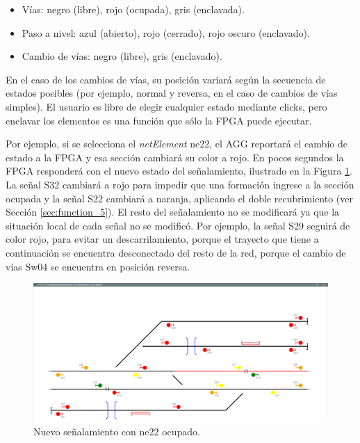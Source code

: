 	\begin{itemize}
		\item Vías: negro (libre), rojo (ocupada), gris (enclavada).
		\item Paso a nivel: azul (abierto), rojo (cerrado), rojo oscuro (enclavado).
		\item Cambio de vías: negro (libre), gris (enclavado).
	\end{itemize}
	
	En el caso de los cambios de vías, su posición variará según la secuencia de estados posibles (por ejemplo, normal y reversa, en el caso de cambios de vías simples). El usuario es libre de elegir cualquier estado mediante clicks, pero enclavar los elementos es una función que sólo la FPGA puede ejecutar.
	
	Por ejemplo, si se selecciona el \textit{netElement} ne22, el AGG reportará el cambio de estado a la FPGA y esa sección cambiará su color a rojo. En pocos segundos la FPGA responderá con el nuevo estado del señalamiento, ilustrado en la Figura \ref{fig:EJ1_AGG_S32_OCCUPIED}. La señal S32 cambiará a rojo para impedir que una formación ingrese a la sección ocupada y la señal S22 cambiará a naranja, aplicando el doble recubrimiento (ver Sección \ref{sec:function_5}). El resto del señalamiento no se modificará ya que la situación local de cada señal no se modificó. Por ejemplo, la señal S29 seguirá de color rojo, para evitar un descarrilamiento, porque el trayecto que tiene a continuación se encuentra desconectado del resto de la red, porque el cambio de vías Sw04 se encuentra en posición reversa.
	
	\begin{figure}[H]
		\centering
		\includegraphics[origin = c, width=1\textwidth]{resultados-obtenidos/ejemplo1/images/AGG_S32_OCCUPIED}
		\centering\caption{Nuevo señalamiento con ne22 ocupado.}
		\label{fig:EJ1_AGG_S32_OCCUPIED}
	\end{figure}

